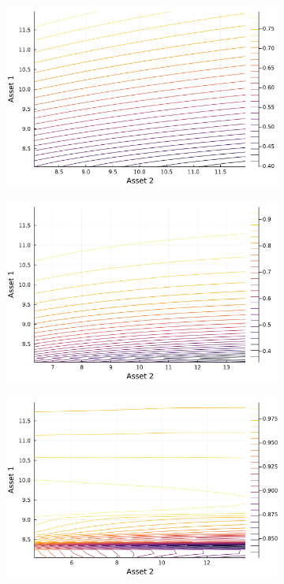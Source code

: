 \documentclass{article}
\begin{document}
\begin{figure}
    \centering
    \begin{subfigure}{0.4\textwidth}
        \includegraphics[width=\textwidth]{../plots/params/baseline/b11.png}
        \end{subfigure}
    \begin{subfigure}{0.4\textwidth}
        \includegraphics[width=\textwidth]{../plots/params/a2-mean-shift/b11.png}
    \end{subfigure}
    \begin{subfigure}{0.4\textwidth}
        \includegraphics[width=\textwidth]{../plots/params/a2-meanvar-shift/b11.png}

\end{subfigure}
\end{figure}
\end{document}
